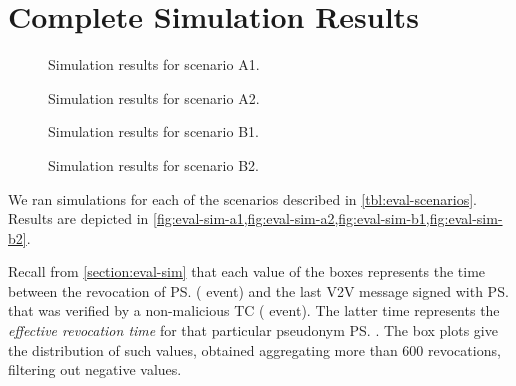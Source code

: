 \section{Complete Simulation Results}
\label{appendix:simulation}



\begin{figure}[t]
    \centering
    \hspace*{-0.3cm}
    \resizebox{.9\linewidth}{!} {
      
    } \caption{Simulation results for scenario A1.}
    \label{fig:eval-sim-a1}
\end{figure}

\begin{figure}[t]
    \centering
    \hspace*{-0.3cm}
    \resizebox{.9\linewidth}{!} {
      
    } \caption{Simulation results for scenario A2.}
    \label{fig:eval-sim-a2}
\end{figure}

\begin{figure}[t]
    \centering
    \hspace*{-0.3cm}
    \resizebox{.9\linewidth}{!} {
      
    } \caption{Simulation results for scenario B1.}
    \label{fig:eval-sim-b1}
\end{figure}

\begin{figure}[t]
    \centering
    \hspace*{-0.3cm}
    \resizebox{.9\linewidth}{!} {
      
    } \caption{Simulation results for scenario B2.}
    \label{fig:eval-sim-b2}
\end{figure}

We ran simulations for each of the scenarios described in
\cref{tbl:eval-scenarios}. Results are depicted in
\cref{fig:eval-sim-a1,fig:eval-sim-a2,fig:eval-sim-b1,fig:eval-sim-b2}.

Recall from \cref{section:eval-sim} that each value of the boxes represents the
time between the revocation of \ps{} (\funcrevokedaa{} event) and the last
\ac{V2V} message signed with \ps{} that was verified by a non-malicious \ac{TC}
(\funcverify{} event). The latter time represents the \emph{effective revocation
time} for that particular pseudonym \ps. The box plots give the distribution of
such values, obtained aggregating more than 600 revocations, filtering out
negative values.

